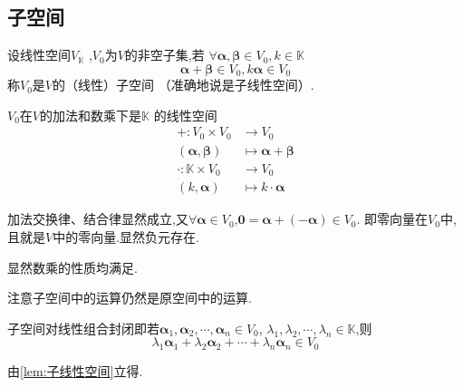 \subsection{子空间}
\begin{formal}
\begin{definition}[子空间]\label{def:子空间}
    设线性空间$V_{\mathbb{K}}$
    ,$V_0$为$V$的非空子集,若
    $\forall \bm{\alpha},\bm{\beta}
    \in V_0,k \in \mathbb{K}$
    \[
    \bm{\alpha}+\bm{\beta} \in V_0,k\bm{\alpha
    } \in V_0
    \]
    称$V_0$是$V$的（线性）子空间
    （准确地说是子线性空间）.
\end{definition}
\end{formal}
\begin{green}
\begin{lemma}[子线性空间]\label{lem:子线性空间}
    $V_0$在$V$的加法和数乘下是$\mathbb{K}$
    的线性空间
    \begin{align*}
        + : 
        V_0 \times V_0 
        & \longrightarrow 
        V_0 \\
        \left(
            \bm{\alpha},\bm{\beta}
        \right)
        & \longmapsto
        \bm{\alpha}+\bm{\beta}
        \\
        \cdot : \mathbb{K} \times 
        V_0 
        & \longrightarrow  
        V_0 \\
        \left(k,\bm{\alpha}
        \right) 
        & \longmapsto 
        k \cdot \bm{\alpha}
    \end{align*}
\end{lemma}
\begin{Proof}
加法交换律、结合律显然成立,又$\forall\bm{\alpha}\in V_0$,$\bm{0}=\bm{\alpha}+\left(-\bm{\alpha}\right)\in V_0$.
即零向量在$V_0$中,且就是$V$中的零向量.显然负元存在.

显然数乘的性质均满足.
\end{Proof}
\end{green}
\begin{red}
\begin{remark}
    注意子空间中的运算仍然是原空间中的运算.
\end{remark}
\end{red}
\begin{green}
\begin{corollary}[线性组合封闭]\label{cor:线性组合封闭}
    子空间对线性组合封闭即若$\bm{\alpha}_1,\bm{\alpha}_2,\cdots,\bm{\alpha}_n\in V_0$,
    $\lambda_1,\lambda_2,\cdots,\lambda_n\in \mathbb{K}$,则
    \[
    \lambda_1\bm{\alpha}_1+\lambda_2\bm{\alpha}_2+\cdots+\lambda_n\bm{\alpha}_n\in V_0
    \]
\end{corollary}
\begin{Proof}
    由\cref{lem:子线性空间}立得.
\end{Proof}
\end{green}
